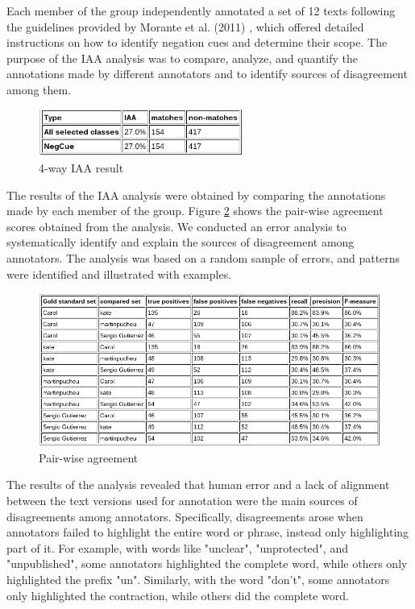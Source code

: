 Each member of the group independently annotated a set of 12 texts following the guidelines provided by Morante et al. (2011) \cite{morante2011annotation}, which offered detailed instructions on how to identify negation cues and determine their scope. The purpose of the IAA analysis was to compare, analyze, and quantify the annotations made by different annotators and to identify sources of disagreement among them.

\begin{figure}[!h]
\begin{center}
  \includegraphics[width=0.6\textwidth]{python_and_notebooks/Plots_and_results/4way.png}
  \caption{4-way IAA result}
  \label{fig:4way}
\end{center}  
\end{figure}

The results of the IAA analysis were obtained by comparing the annotations made by each member of the group. Figure \ref{fig:Pairwise agreement} shows the pair-wise agreement scores obtained from the analysis. We conducted an error analysis to systematically identify and explain the sources of disagreement among annotators. The analysis was based on a random sample of errors, and patterns were identified and illustrated with examples.

\begin{figure}[!h]
  \includegraphics[width=\linewidth]{python_and_notebooks/Plots_and_results//pairwise.png}
  \caption{Pair-wise agreement}
  \label{fig:Pairwise agreement}
\end{figure}

The results of the analysis revealed that human error and a lack of alignment between the text versions used for annotation were the main sources of disagreements among annotators. Specifically, disagreements arose when annotators failed to highlight the entire word or phrase, instead only highlighting part of it. For example, with words like "unclear", "unprotected", and "unpublished", some annotators highlighted the complete word, while others only highlighted the prefix "un". Similarly, with the word "don't", some annotators only highlighted the contraction, while others did the complete word. 

